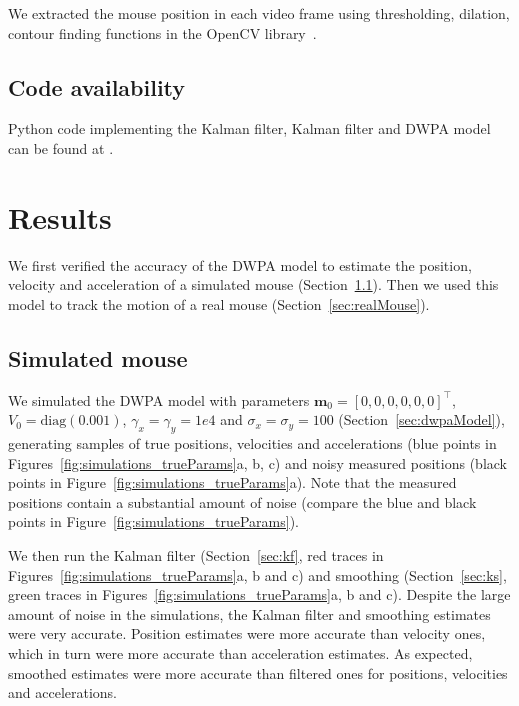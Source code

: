 \documentclass[12pt]{article}
\begin{document}
We extracted the mouse position in each video frame using thresholding,
dilation, contour finding functions in the OpenCV library~\cite{c1}.

\subsection{Code availability}

Python code implementing the Kalman filter, Kalman filter and DWPA model can be
found at \cite{c2}.

\section{Results}

We first verified the accuracy of the DWPA model to estimate the position,
velocity and acceleration of a simulated mouse (Section~\ref{sec:simulatedMouse}). Then we used this model to
track the motion of a real mouse (Section~\ref{sec:realMouse}).

\subsection{Simulated mouse}
\label{sec:simulatedMouse}

We simulated the DWPA model with parameters $\mathbf{m}_0=[0, 0, 0, 0, 0,
0]^\intercal$, $V_0=\text{diag}(0.001)$, $\gamma_x=\gamma_y=1e4$ and
$\sigma_x=\sigma_y=100$ (Section~\ref{sec:dwpaModel}), generating samples of
true positions, velocities and accelerations (blue points in
Figures~\ref{fig:simulations_trueParams}a, b, c) and noisy measured positions (black
points in Figure~\ref{fig:simulations_trueParams}a). Note that the measured positions
contain a substantial amount of noise (compare the blue and black points in
Figure~\ref{fig:simulations_trueParams}).

We then run the Kalman filter (Section~\ref{sec:kf}, red traces in
Figures~\ref{fig:simulations_trueParams}a, b and c) and smoothing
(Section~\ref{sec:ks}, green traces in Figures~\ref{fig:simulations_trueParams}a, b and c).
Despite the large amount of noise in the simulations, the Kalman filter and
smoothing estimates were very accurate.
%
Position estimates were more accurate than velocity ones, which in turn were
more accurate than acceleration estimates.
%
As expected, smoothed estimates were more accurate than filtered ones for
positions, velocities and accelerations.
\end{document}
